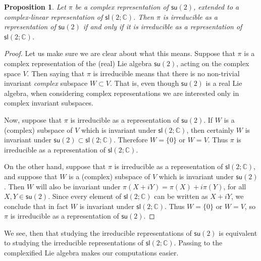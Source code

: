 \documentclass{amsbook}
\theoremstyle{plain}
\newtheorem{proposition}[theorem]{Proposition}
\numberwithin{equation}{chapter}
\numberwithin{theorem}{chapter}
\begin{document}
\begin{proposition}
Let $\pi$ be a complex representation of $\mathsf{su}(2)$, extended to a
complex-linear representation of $\mathsf{sl}(2;\mathbb{C})$. Then $\pi$ is
irreducible as a representation of $\mathsf{su}(2)$ if and only if it is
irreducible as a representation of $\mathsf{sl}(2;\mathbb{C})$.
\end{proposition}

\begin{proof}
Let us make sure we are clear about what this means. Suppose that $\pi$ is a
complex representation of the (real) Lie algebra $\mathsf{su}(2)$, acting on
the complex space $V$. Then saying that $\pi$ is irreducible means that there
is no non-trivial invariant \textit{complex} subspace $W\subset V$. That is,
even though $\mathsf{su}(2)$ is a real Lie algebra, when considering complex
representations we are interested only in complex invariant subspaces.

Now, suppose that $\pi$ is irreducible as a representation of $\mathsf{su}%
(2)$. If $W$ is a (complex) subspace of $V$ which is invariant under
$\mathsf{sl}(2;\mathbb{C})$, then certainly $W$ is invariant under
$\mathsf{su}(2)\subset\mathsf{sl}(2;\mathbb{C})$. Therefore $W=\{0\}$ or
$W=V$. Thus $\pi$ is irreducible as a representation of $\mathsf{sl}%
(2;\mathbb{C})$.

On the other hand, suppose that $\pi$ is irreducible as a representation of
$\mathsf{sl}(2;\mathbb{C})$, and suppose that $W$ is a (complex) subspace of
$V$ which is invariant under $\mathsf{su}(2)$. Then $W$ will also be invariant
under $\pi(X+iY)=\pi(X)+i\pi(Y)$, for all $X,Y\in\mathsf{su}(2)$. Since every
element of $\mathsf{sl}(2;\mathbb{C})$ can be written as $X+iY$, we conclude
that in fact $W$ is invariant under $\mathsf{sl}(2;\mathbb{C})$. Thus
$W=\{0\}$ or $W=V$, so $\pi$ is irreducible as a representation of
$\mathsf{su}(2)$.
\end{proof}

We see, then that studying the irreducible representations of $\mathsf{su}(2)
$ is equivalent to studying the irreducible representations of $\mathsf{sl}%
(2;\mathbb{C})$. Passing to the complexified Lie algebra makes our
computations easier.
\end{document}
